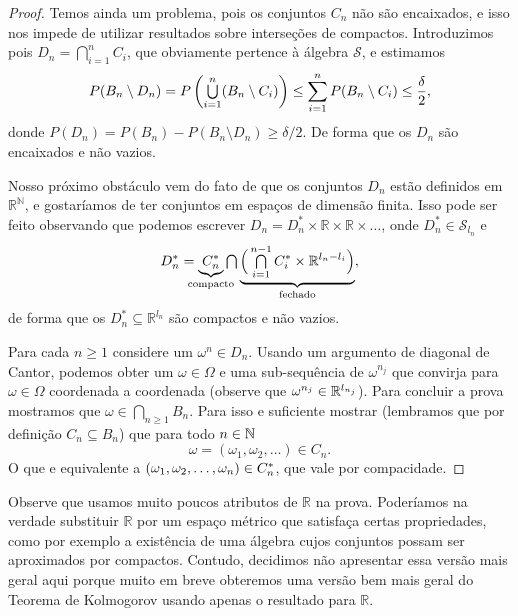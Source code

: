 \begin{proof}
  Temos ainda um problema, pois os conjuntos $C_n$ não são encaixados, e isso nos impede de utilizar resultados sobre interseções de compactos.
  Introduzimos pois $D_n = \bigcap_{i=1}^n C_i$, que obviamente pertence à álgebra $\mathcal{S}$, e estimamos
  \begin{equation}
    P(B_n \setminus D_n) = P \left( \operatorname*{{\textstyle \bigcup}}_{i=1}^n (B_n \setminus C_i) \right) \leq \sum_{i=1}^n P(B_n \setminus C_i) \leq \frac{\delta}2,
  \end{equation}
  donde $P(D_n) = P(B_n) - P(B_n \setminus D_n) \geq \delta/2$.
  De forma que os $D_n$ são encaixados e não vazios.

  Nosso próximo obstáculo vem do fato de que os conjuntos $D_n$ estão definidos em $\mathbb{R}^\mathbb{N}$, e 
  gostaríamos de ter conjuntos em espaços de dimensão finita.
  Isso pode ser feito observando que podemos escrever $D_n = D_n^* \times \mathbb{R} \times \mathbb{R} \times \dots$, onde $D_n^* \in \mathcal{S}_{l_n}$ e
  \begin{equation}
    D_n^* = \underbrace{C_n^*}_{\mathclap{\text{compacto}}} \mcap \underbrace{ \Big( \mcap_{i=1}^{n-1} C_i^* \times \mathbb{R}^{l_n - l_i} \Big)}_{\text{fechado}},
  \end{equation}
  de forma que os $D_n^* \subseteq \mathbb{R}^{l_n}$ são compactos  e não vazios.

  Para cada $n \geq 1$ considere um $\omega^n \in D_n$.
  Usando um argumento de diagonal de Cantor, podemos obter um $\omega \in \Omega$ 
  e uma sub-sequência de $\omega^{n_j}$ que convirja para $\omega \in \Omega$ coordenada a coordenada 
  (observe que $\omega^{n_j} \in \mathbb{R}^{\smash{l_{n_j}}}$).  %
 Para concluir a prova mostramos que $\omega \in \bigcap_{n\ge 1} B_n$.
 Para isso e suficiente mostrar (lembramos que por definição $C_n \subseteq B_n$) que para todo $n\in {\ensuremath{\mathbb N}}$
  \begin{equation*}
\omega = (\omega_1, \omega_2, \dots) \in C_n.
  \end{equation*}
O que e equivalente a $(\omega_1, \omega_2, \dots, \omega_n) \in C^*_n$, que vale por compacidade.
  
  \end{proof}

Observe que usamos muito poucos atributos de $\mathbb{R}$ na prova.
Poderíamos na verdade substituir $\mathbb{R}$ por um espaço métrico que satisfaça certas propriedades, como por exemplo a existência de uma álgebra cujos 
conjuntos possam ser aproximados por compactos.
Contudo, decidimos não apresentar essa versão mais geral aqui porque muito em breve obteremos uma versão bem mais geral do Teorema de Kolmogorov usando apenas o resultado para $\mathbb{R}$.

